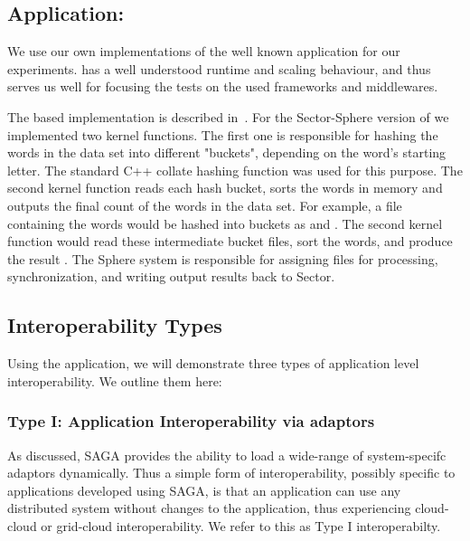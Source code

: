 \documentclass[3p,twocolumn]{elsarticle}
\begin{document}
\subsection{Application: \Wc}
\label{ssec:app}

We use our own implementations of the well known \wc application for
our experiments.  \Wc has a well understood runtime and scaling
behaviour, and thus serves us well for focusing the tests on the used
frameworks and middlewares.

The \mr based \wc implementation is described in~\cite{saga_ccgrid09}.
For the Sector-Sphere version of \wc we implemented two kernel
functions. The first one is responsible for hashing the
words in the data set into different "buckets", depending on
the word's starting letter.  The standard C++ collate hashing function
was used for this purpose.  The second kernel function reads each hash
bucket, sorts the words in memory and outputs the final count of
the words in the data set.  For example, a file containing the words
 would be hashed into buckets as
 and .  The second kernel
function would read these intermediate bucket files, sort the words,
and produce the result .  The Sphere system is responsible for assigning files for
processing, synchronization, and writing output results back to
Sector.

\subsection{Interoperability Types}

Using the \wc application, we will demonstrate three types of
application level interoperability. We outline them here:


\subsubsection{Type I: Application Interoperability via adaptors}
%
%

As discussed, SAGA provides the ability to load a wide-range of
system-specifc adaptors dynamically. Thus a simple form of
interoperability, possibly specific to applications developed using
SAGA, is that an application can use any distributed system without
changes to the application, thus experiencing cloud-cloud or
grid-cloud interoperability.  We refer to this as Type I
interoperabilty.
\end{document}
